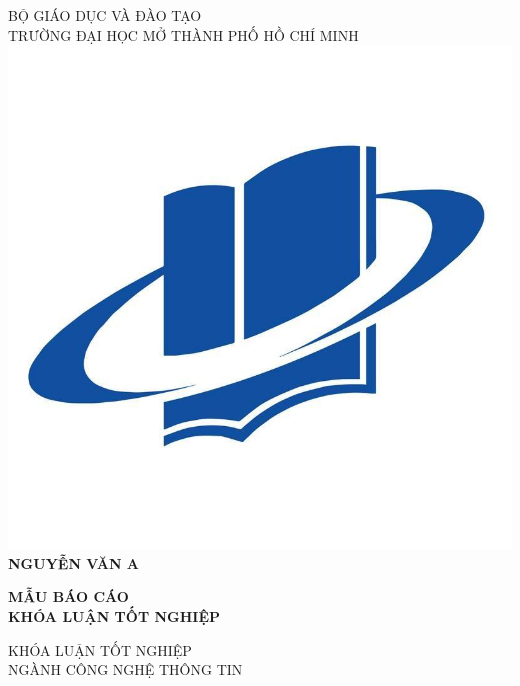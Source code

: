 \begin{titlepage}

\begin{center}
{BỘ GIÁO DỤC VÀ ĐÀO TẠO}\\
{TRƯỜNG ĐẠI HỌC MỞ THÀNH PHỐ HỒ CHÍ MINH}\\[1cm]

\includegraphics[scale=0.15]{images/logo}\\[1.5cm]

{ \Large \bfseries NGUYỄN VĂN A\\[2.5cm] } 

{ \huge \bfseries MẪU BÁO CÁO\\KHÓA LUẬN TỐT NGHIỆP
\\[2.5cm]} 


\large KHÓA LUẬN TỐT NGHIỆP\\

\large NGÀNH CÔNG NGHỆ THÔNG TIN%


\end{center}
\end{titlepage}
